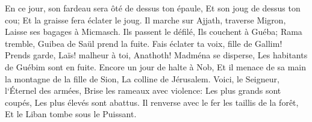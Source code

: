 \verse En ce jour, son fardeau sera ôté de dessus ton épaule, Et son joug de dessus ton cou; Et la graisse fera éclater le joug. 
\verse Il marche sur Ajjath, traverse Migron, Laisse ses bagages à Micmasch. 
\verse Ils passent le défilé, Ils couchent à Guéba; Rama tremble, Guibea de Saül prend la fuite. 
\verse Fais éclater ta voix, fille de Gallim! Prends garde, Laïs! malheur à toi, Anathoth! 
\verse Madména se disperse, Les habitants de Guébim sont en fuite. 
\verse Encore un jour de halte à Nob, Et il menace de sa main la montagne de la fille de Sion, La colline de Jérusalem. 
\verse Voici, le Seigneur, l`Éternel des armées, Brise les rameaux avec violence: Les plus grands sont coupés, Les plus élevés sont abattus. 
\verse Il renverse avec le fer les taillis de la forêt, Et le Liban tombe sous le Puissant. 

